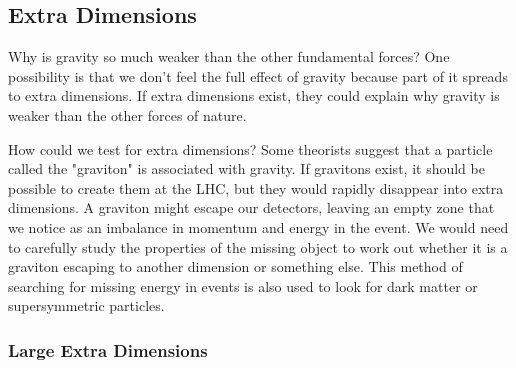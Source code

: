 \subsection{Extra Dimensions}

Why is gravity so much weaker than the other fundamental forces?  One possibility is that we don’t feel the full effect of gravity  because part of it spreads to extra dimensions. If extra dimensions exist, they could explain why gravity is weaker than the other forces of nature.

How could we test for extra dimensions? 
Some theorists suggest that a particle called the "graviton" is associated with gravity. If gravitons exist, it should be possible to create them at the LHC, but they would rapidly disappear into extra dimensions. A graviton might escape our detectors, leaving an empty zone that we notice as an imbalance in momentum and energy in the event. We would need to carefully study the properties of the missing object to work out whether it is a graviton escaping to another dimension or something else. This method of searching for missing energy in events is also used to look for dark matter or supersymmetric particles.

	

\subsubsection{Large Extra Dimensions}

